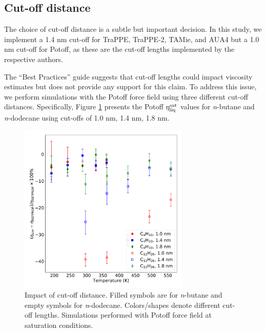 \documentclass[preprint,review,12pt]{elsarticle}
\begin{document}
	
	\subsection{Cut-off distance}
	
	The choice of cut-off distance is a subtle but important decision. In this study, we implement a 1.4 nm cut-off for TraPPE, TraPPE-2, TAMie, and AUA4 but a 1.0 nm cut-off for Potoff, as these are the cut-off lengths implemented by the respective authors.
	
	
	The ``Best Practices'' guide suggests that cut-off lengths could impact viscosity estimates but does not provide any support for this claim. To address this issue, we perform simulations with the Potoff force field using three different cut-off distances. Specifically, Figure \ref{fig:cutoff_distance} presents the Potoff $\eta_{\rm liq}^{\rm sat}$ values for \textit{n}-butane and \textit{n}-dodecane using cut-offs of 1.0 nm, 1.4 nm, 1.8 nm. 
	
	
	\begin{figure}[htb!]
		\centering
		\includegraphics[width=3.2in]{cutoff_distance.pdf}
		\caption{Impact of cut-off distance. Filled symbols are for \textit{n}-butane and empty symbols for \textit{n}-dodecane. Colors/shapes denote different cut-off lengths. Simulations performed with Potoff force field at saturation conditions.}
		\label{fig:cutoff_distance}
	\end{figure} 
\end{document}
